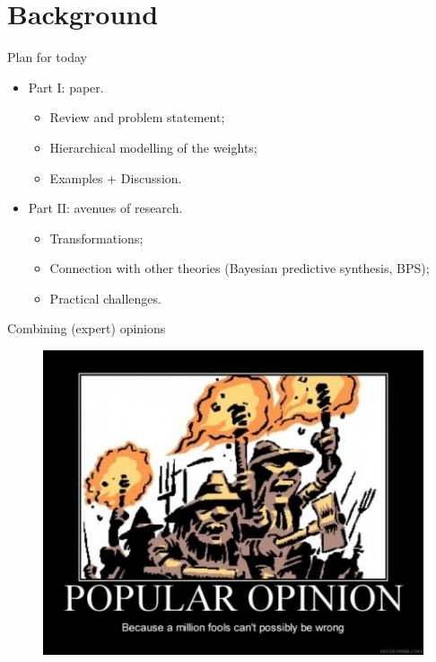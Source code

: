 \section*{Background}
\begin{frame}[t,plain]
\titlepage
\end{frame}
\begin{frame}{Plan for today}
\begin{itemize}
 \item Part I: paper.
\begin{itemize}
 \item Review and problem statement;
 \item Hierarchical modelling of the weights;
 \item Examples + Discussion.
\end{itemize}
\item Part II: avenues of research.
\begin{itemize}
 \item Transformations;
 \item Connection with other theories (Bayesian predictive synthesis, BPS);
 \item Practical challenges.
\end{itemize}
\end{itemize}
\end{frame}
\begin{frame}{Combining (expert) opinions}
\begin{figure}
 \begin{center}
  \includegraphics[scale=0.5]{../figures/Consensus.jpg}
 \end{center}
\end{figure}
\end{frame}

